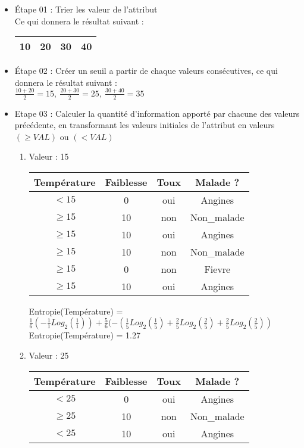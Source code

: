 \documentclass[a4paper, 11pt]{report}
\begin{document}
\begin{itemize}
\item Étape 01 : Trier les valeur de l'attribut\\
Ce qui donnera le résultat suivant : 
\begin{tabular}{| c | c | c | c |}
\hline
10 & 20 & 30 & 40\\
\hline
\end{tabular}

\item Étape 02 : Créer un seuil a partir de chaque valeurs consécutives, ce qui donnera le résultat suivant :\\
$\frac{10+20}{2} = 15, \ \frac{20+30}{2} = 25, \ \frac{30+40}{2} = 35$

\item Etape 03 : Calculer la quantité d'information apporté par chacune des valeurs précédente, en transformant les valeurs initiales de l'attribut en valeurs $(\ge VAL)$ ou $(< VAL)$
\begin{enumerate}
\item Valeur : 15


\begin{center}
\begin{tabular}{| c | c | c | c |}
\hline
Température & Faiblesse & Toux & Malade ?\\
\hline
$< 15$ & 0 & oui & Angines\\
\hline
$\ge 15$ & 10 & non & Non\_malade\\
\hline
$\ge 15$ & 10 & oui & Angines\\
\hline

$\ge 15$ & 10 & non & Non\_malade\\
\hline

$\ge 15$ & 0 & non & Fievre\\
\hline

$\ge 15$ & 10 & oui & Angines\\
\hline
\end{tabular}
\end{center}

Entropie(Température) = $\frac{1}{6}( - \frac{1}{1}Log_2(\frac{1}{1}))+\frac{5}{6}(- (\frac{1}{5}
Log_2(\frac{1}{5})+ \frac{2}{5}Log_2(\frac{2}{5})+\frac{2}{5}Log_2(\frac{2}{5}))$\\
Entropie(Température) = 1.27

\item Valeur : 25 

\begin{center}
\begin{tabular}{| c | c | c | c |}
\hline
Température & Faiblesse & Toux & Malade ?\\
\hline
$<25$ & 0 & oui & Angines\\
\hline
$\ge 25$ & 10 & non & Non\_malade\\
\hline
$<25$ & 10 & oui & Angines\\
\hline


\end{tabular}
\end{center}
\end{enumerate}
\end{itemize}
\end{document}
